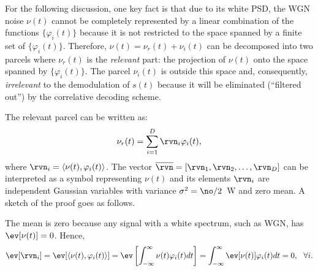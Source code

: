 For the following discussion, one key fact is that due to its white PSD, the WGN noise $\nu(t)$ cannot be completely represented by a linear combination of the functions $\{\varphi_i(t)\}$ because it is not restricted to the space spanned by a finite set of $\{\varphi_i(t)\}$. Therefore, $\nu(t)=\nu_r(t)+\nu_i(t)$ can be decomposed into two parcels where $\nu_r(t)$ is the \emph{relevant} part: the projection of $\nu(t)$ onto the space spanned by $\{\varphi_i(t)\}$. The parcel $\nu_i(t)$ is outside this space and, consequently, \emph{irrelevant} to the demodulation of $s(t)$ because it will be eliminated (``filtered out'') by the correlative decoding scheme.

The relevant parcel can be written as:
\begin{equation}
\nu_r(t) = \sum_{i=1}^D \rvn_i \varphi_i(t),
\label{eq:wgnComposedByLinearCombination}
\end{equation}
where $\rvn_i = \langle \nu(t), \varphi_i(t) \rangle$. The vector $\overline{\rvn} = [\rvn_1, \rvn_2, \ldots, \rvn_D]$ can be interpreted as a symbol representing $\nu(t)$ and its elements $\rvn_i$ are independent Gaussian variables 
with variance $\sigma^2=\no / 2$~W and zero mean.
A sketch of the proof goes as follows.


The mean is zero because any signal with a white spectrum, such as WGN, has $\ev[\nu(t)]=0$. Hence,
\begin{equation}
\ev[\rvn_i]=\ev[\langle \nu(t), \varphi_i(t) \rangle] = \ev \left[ \int_{-\infty}^{\infty} \nu(t)\varphi_i(t) dt \right]=\int_{-\infty}^{\infty} \ev[\nu(t)]\varphi_i(t) dt=0, \textrm{~~}\forall i.
\label{eq:wgnMeanIsZero}
\end{equation}

